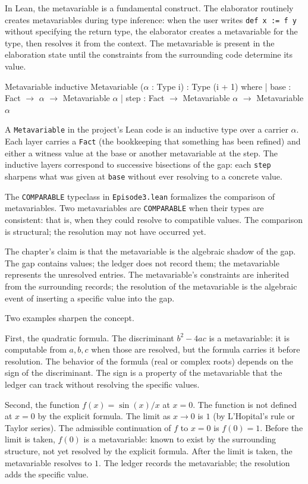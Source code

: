 In Lean, the metavariable is a fundamental construct. The
elaborator routinely creates metavariables during type inference:
when the user writes \texttt{def x := f y} without specifying
the return type, the elaborator creates a metavariable for the
type, then resolves it from the context. The metavariable is
present in the elaboration state until the constraints from
the surrounding code determine its value.

\begin{leanexcerpt}{Metavariable}
inductive Metavariable ($\alpha$ : Type i) : Type (i + 1) where
  | base : Fact $\to$ $\alpha$ $\to$ Metavariable $\alpha$
  | step : Fact $\to$ Metavariable $\alpha$ $\to$ Metavariable $\alpha$
\end{leanexcerpt}

A \texttt{Metavariable} in the project's Lean code is an inductive
type over a carrier $\alpha$. Each layer carries a \texttt{Fact}
(the bookkeeping that something has been refined) and either a
witness value at the base or another metavariable at the step. The
inductive layers correspond to successive bisections of the gap:
each \texttt{step} sharpens what was given at \texttt{base} without
ever resolving to a concrete value.

The \texttt{COMPARABLE} typeclass in \texttt{Episode3.lean}
formalizes the comparison of metavariables. Two metavariables are
\texttt{COMPARABLE} when their types are consistent: that is, when
they could resolve to compatible values. The comparison is
structural; the resolution may not have occurred yet.

The chapter's claim is that the metavariable is the algebraic
shadow of the gap. The gap contains values; the ledger does not
record them; the metavariable represents the unresolved entries.
The metavariable's constraints are inherited from the surrounding
records; the resolution of the metavariable is the algebraic
event of inserting a specific value into the gap.

Two examples sharpen the concept.

First, the quadratic formula. The discriminant $b^2 - 4ac$ is a
metavariable: it is computable from $a, b, c$ when those are
resolved, but the formula carries it before resolution. The
behavior of the formula (real or complex roots) depends on the
sign of the discriminant. The sign is a property of the
metavariable that the ledger can track without resolving the
specific values.

Second, the function $f(x) = \sin(x)/x$ at $x = 0$. The function
is not defined at $x = 0$ by the explicit formula. The limit as
$x \to 0$ is $1$ (by L'Hopital's rule or Taylor series). The
admissible continuation of $f$ to $x = 0$ is $f(0) = 1$. Before
the limit is taken, $f(0)$ is a metavariable: known to exist by
the surrounding structure, not yet resolved by the explicit
formula. After the limit is taken, the metavariable resolves to
$1$. The ledger records the metavariable; the resolution adds the
specific value.

